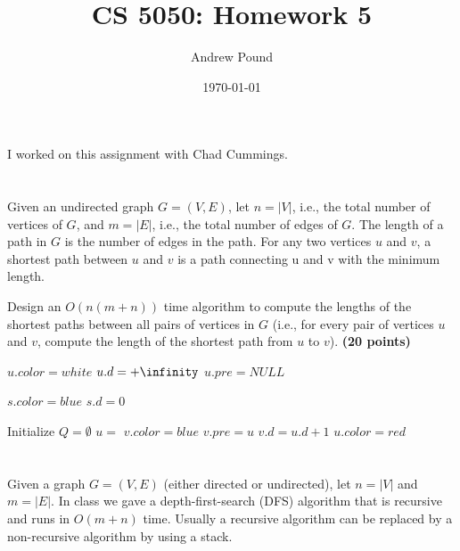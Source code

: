 \documentclass{article}
\title{CS 5050: Homework 5}
\author{Andrew Pound}
\date{\today}
\begin{document}
\maketitle

I worked on this assignment with Chad Cummings.
\section{}
Given an undirected graph $G = (V, E)$, let $n = |V|$, i.e., the total 
number of vertices of $G$, and $m = |E|$, i.e., the total number of
edges of $G$. The length of a path in $G$ is the number of edges in
the path. For any two vertices $u$ and $v$, a shortest path between
$u$ and $v$ is a path connecting u and v with the minimum length. 

Design an $O(n(m + n))$ time algorithm to compute the lengths of the
shortest paths between all pairs of vertices in $G$ (i.e., for every
pair of vertices $u$ and $v$, compute the length of the shortest path
from $u$ to $v$). {\bf (20 points) }



{\singlespacing
\begin{algorithmic}
      \State $u.color  = white$
      \State $u.d = +\infinity$
      \State $u.pre = NULL$
    \EndFor
    
    \State $s.color = blue$
    \State $s.d = 0$
    
    \State Initialize $Q = \emptyset$
    \State {}
      \State $u = $ 
          \State $v.color = blue$
          \State {}
          \State $v.pre = u$
          \State $v.d = u.d + 1$
        \EndIf
      \EndFor
      \State $u.color = red$
    \EndWhile
\EndFunction    
\end{algorithmic}
}



\section{}
Given a graph $G = (V, E)$ (either directed or undirected), let $n = 
|V|$ and $m = |E|$. In class we gave a depth-first-search (DFS)
algorithm that is recursive and runs in $O(m + n)$ time.  Usually a
recursive algorithm can be replaced by a non-recursive algorithm by
using a stack. 
\end{document}
